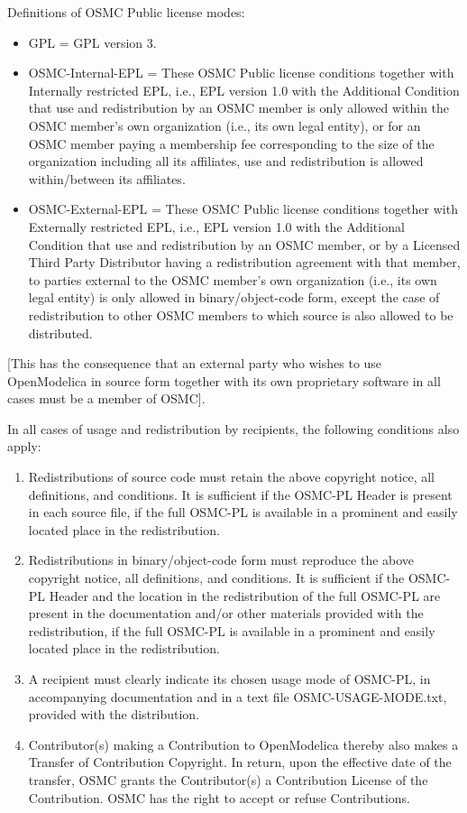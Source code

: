 \documentclass[a4paper, 12pt]{article}
\begin{document}
Definitions of OSMC Public license modes:

\begin{itemize}
\item GPL = GPL version 3.
\item OSMC-Internal-EPL = These OSMC Public license conditions together with Internally restricted EPL, i.e., EPL version 1.0 with the Additional Condition that use and redistribution by an OSMC member is only allowed within the OSMC member's own organization (i.e., its own legal entity), or for an OSMC member paying a membership fee corresponding to the size of the organization including all its affiliates, use and redistribution is allowed within/between its affiliates.
\item OSMC-External-EPL = These OSMC Public license conditions together with Externally restricted EPL, i.e., EPL version 1.0 with the Additional Condition that use and redistribution by an OSMC member, or by a Licensed Third Party Distributor having a redistribution agreement with that member, to parties external to the OSMC member’s own organization (i.e., its own legal entity) is only allowed in binary/object-code form, except the case of  redistribution to other OSMC members to which source is also allowed to be distributed.
\end{itemize}

[This has the consequence that an external party who wishes to use OpenModelica in source form together with its own proprietary software in all cases must be a member of OSMC].

\vspace{0.5cm}

In all cases of usage and redistribution by recipients, the following
conditions also apply:
\begin{enumerate}[label=\alph*)]
\item Redistributions of source code must retain the above copyright notice, all definitions, and conditions. It is sufficient if the OSMC-PL Header is present in each source file, if the full OSMC-PL is available in a prominent and easily located place in the redistribution.
\item Redistributions in binary/object-code form must reproduce the above copyright notice, all definitions, and conditions. It is sufficient if the OSMC-PL Header and the location in the redistribution of the full OSMC-PL are present in the documentation and/or other materials provided with the  redistribution, if the full OSMC-PL is available in a prominent and easily located place in the redistribution.
\item A recipient must clearly indicate its chosen usage mode of OSMC-PL, in accompanying documentation and in a text file OSMC-USAGE-MODE.txt, provided with the distribution.
\item Contributor(s) making a Contribution to OpenModelica thereby also makes a Transfer of Contribution Copyright. In return, upon the effective date of the transfer, OSMC grants the Contributor(s) a Contribution License of the Contribution. OSMC has the right to accept or refuse Contributions.
\end{enumerate}
\end{document}
